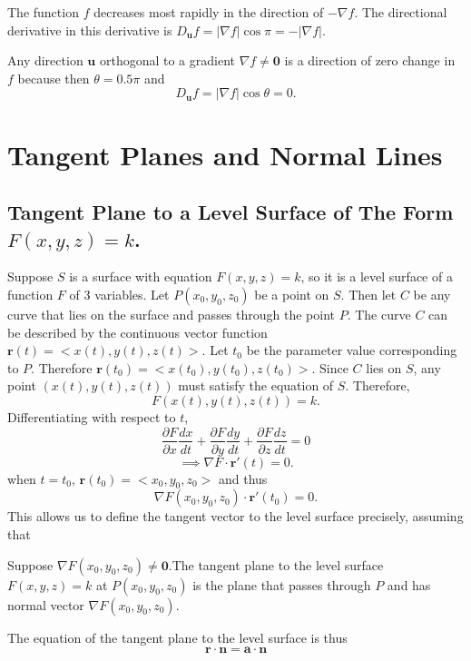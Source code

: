 \documentclass{article}
\begin{document}
\begin{note}
    The function $f$ decreases most rapidly in the direction of $-\nabla f$. The directional derivative in this derivative is $D_{\bm{u}}f=|\nabla f|\cos{\pi}=-|\nabla f|.$
\end{note}
\begin{note}
    Any direction $\bm{u}$ orthogonal to a gradient $\nabla f\neq \bm{0}$ is a direction of zero change in $f$ because then $\theta=0.5\pi$ and 
    $$D_{\bm{u}}f=|\nabla f|\cos{\theta}=0.$$
\end{note}
\section{Tangent Planes and Normal Lines}
\subsection{Tangent Plane to a Level Surface of The Form $F(x,y,z)=k$.}
Suppose $S$ is a surface with equation $F(x,y,z)=k$, so it is a level surface of a function $F$ of 3 variables. Let $P(x_0,y_0,z_0)$ be a point on $S$. Then let $C$ be any curve that lies on the surface and passes through the point $P$. The curve $C$ can be described by the continuous vector function $\bm{r}(t)=\Big<x(t),y(t),z(t)\Big>$. Let $t_0$ be the parameter value corresponding to $P$. Therefore $\bm{r}(t_0)=\Big<x(t_0),y(t_0),z(t_0)\Big>$. Since $C$ lies on $S$, any point $(x(t),y(t),z(t))$ must satisfy the equation of $S$. Therefore,
$$F(x(t),y(t),z(t))=k.$$
Differentiating with respect to $t$,
$$\frac{\partial F}{\partial x}\frac{dx}{dt}+\frac{\partial F}{\partial y}\frac{dy}{dt}+\frac{\partial F}{\partial z}\frac{dz}{dt}=0$$
$$\implies \nabla F\cdot\bm{r}'(t)=0.$$
when $t=t_0$, $\bm{r}(t_0)=\Big<x_0,y_0,z_0\Big>$ and thus
$$\nabla F(x_0,y_0,z_0)\cdot \bm{r}'(t_0)=0.$$
This allows us to define the tangent vector to the level surface precisely, assuming that 
\begin{definition}
     Suppose $\nabla F(x_0,y_0,z_0)\neq\bm{0}.$The tangent plane to the level surface $F(x,y,z)=k$ at $P(x_0,y_0,z_0)$ is the plane that passes through $P$ and has normal vector $\nabla F(x_0,y_0,z_0)$.
\end{definition}
The equation of the tangent plane to the level surface is thus 
$$\bm{r}\cdot\bm{n}=\bm{a}\cdot\bm{n}$$
\end{document}

